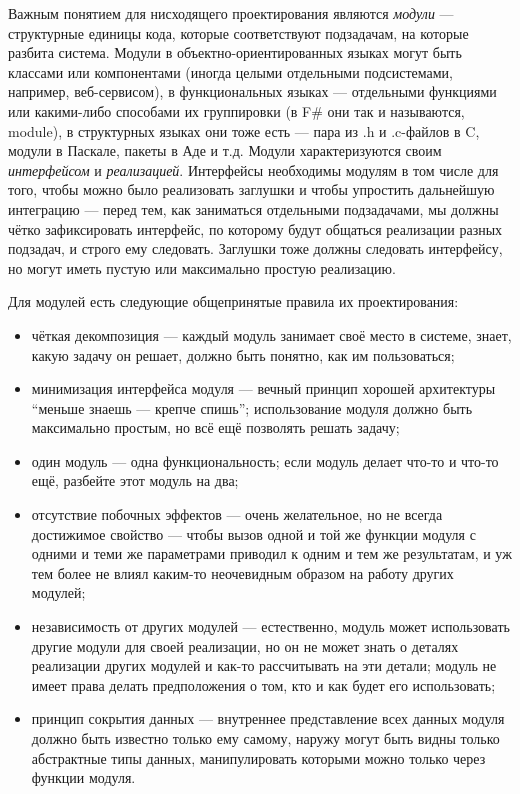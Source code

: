 \documentclass{../../text-style}
\begin{document}
Важным понятием для нисходящего проектирования являются \textit{модули} --- структурные единицы кода, которые соответствуют подзадачам, на которые разбита система. Модули в объектно-ориентированных языках могут быть классами или компонентами (иногда целыми отдельными подсистемами, например, веб-сервисом), в функциональных языках --- отдельными функциями или какими-либо способами их группировки (в F\# они так и называются, module), в структурных языках они тоже есть --- пара из .h и .c-файлов в C, модули в Паскале, пакеты в Аде и т.д. Модули характеризуются своим \textit{интерфейсом} и \textit{реализацией}. Интерфейсы необходимы модулям в том числе для того, чтобы можно было реализовать заглушки и чтобы упростить дальнейшую интеграцию --- перед тем, как заниматься отдельными подзадачами, мы должны чётко зафиксировать интерфейс, по которому будут общаться реализации разных подзадач, и строго ему следовать. Заглушки тоже должны следовать интерфейсу, но могут иметь пустую или максимально простую реализацию.

Для модулей есть следующие общепринятые правила их проектирования:

\begin{itemize}
	\item чёткая декомпозиция --- каждый модуль занимает своё место в системе, знает, какую задачу он решает, должно быть понятно, как им пользоваться;
	\item минимизация интерфейса модуля --- вечный принцип хорошей архитектуры ``меньше знаешь --- крепче спишь''; использование модуля должно быть максимально простым, но всё ещё позволять решать задачу;
	\item один модуль --- одна функциональность; если модуль делает что-то и что-то ещё, разбейте этот модуль на два;
	\item отсутствие побочных эффектов --- очень желательное, но не всегда достижимое свойство --- чтобы вызов одной и той же функции модуля с одними и теми же параметрами приводил к одним и тем же результатам, и уж тем более не влиял каким-то неочевидным образом на работу других модулей;
	\item независимость от других модулей --- естественно, модуль может использовать другие модули для своей реализации, но он не может знать о деталях реализации других модулей и как-то рассчитывать на эти детали; модуль не имеет права делать предположения о том, кто и как будет его использовать;
	\item принцип сокрытия данных --- внутреннее представление всех данных модуля должно быть известно только ему самому, наружу могут быть видны только абстрактные типы данных, манипулировать которыми можно только через функции модуля.
\end{itemize}
\end{document}
